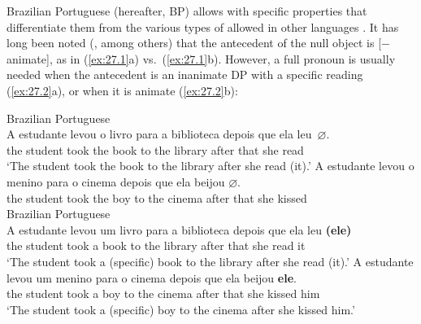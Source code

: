 \documentclass[output=paper]{langsci/langscibook}
\begin{document}
Brazilian Portuguese (hereafter, BP) allows  with specific
properties that differentiate them from the various types of 
allowed in other languages \citep{CyrinoLopes2016}. It has long been noted
(\citealt{Omena1978,Pereira1981,Duarte1986}, among others) that
the antecedent of the null object is [$-$animate], as in (\ref{ex:27.1}a) vs.\
(\ref{ex:27.1}b). However, a full pronoun is usually needed when the
antecedent is an inanimate DP with a specific reading (\ref{ex:27.2}a), or
when it is animate (\ref{ex:27.2}b):

\ea\label{ex:27.1}Brazilian Portuguese\\
    \ea
        \gll    A    estudante levou    o     livro   para  a     biblioteca
        depois   que  ela    leu~\textbf{$\varnothing$}.\\
                the   student      took     the   book  to       the   library after     that  she    read {}\\
        \glt    `The student took the book to the library after she read (it).'
    \ex
        \gll \llap{*}A  estudante  levou     o     menino   para   o cinema depois  que ela   beijou \textbf{$\varnothing$}.\\
                the   student       took     the  boy         to       the cinema after     that   she   kissed\\
        \glt
    \z
\pagebreak
\ex\label{ex:27.2}Brazilian Portuguese\\
    \ea
        \gll A    estudante levou    um   livro   para  a     biblioteca depois que  ela    leu \textbf{(ele)}\\
            the   student      took     a     book   to       the   library after     that  she  read \hphantom{(}it\\
        \glt `The student took a (specific) book to the library after she read (it).'
    \ex
        \gll A  estudante  levou  um menino para  o     cinema     depois  que ela    beijou \textbf{ele}.\\
                the student     took   a     boy       to       the cinema after that   she  kissed  him\\
        \glt    `The student took a (specific) boy to the cinema after she kissed him.'
    \z
\z\largerpage
\end{document}
